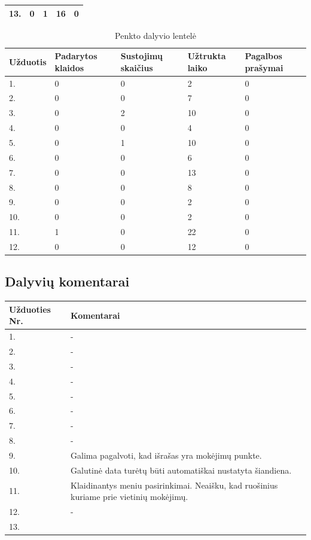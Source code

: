 \documentclass[oneside]{VUMIFPSkursinis}
\begin{document}
\begin{center}
\begin{table}[!pht]
\begin{tabular}{ |p{1.8cm} | p{3.4cm} | p{3.4cm} | p{2.5cm} | p{3.5cm}|}
13.&0&1&16&0 \\ \hline
\end{tabular}
\end{table}
\vspace{0.7cm}
	\begin{table}[!pht]
	\caption{Penkto dalyvio lentelė}
	\begin{tabular}{ |p{1.8cm} | p{3.4cm} | p{3.4cm} | p{2.5cm} | p{3.5cm}|}
	\hline
	Užduotis&Padarytos klaidos&Sustojimų skaičius&Užtrukta laiko&Pagalbos prašymai\\ \hline
1.&0&0&2&0 \\ \hline
2.&0&0&7&0 \\ \hline
3.&0&2&10&0 \\ \hline
4.&0&0&4&0 \\ \hline
5.&0&1&10&0 \\ \hline
6.&0&0&6&0 \\ \hline
7.&0&0&13&0 \\ \hline
8.&0&0&8&0 \\ \hline
9.&0&0&2&0 \\ \hline
10.&0&0&2&0 \\ \hline
11.&1&0&22&0 \\ \hline
12.&0&0&12&0 \\ \hline
\end{tabular}
\end{table}
\vspace{0.7cm}
\end{center}
\subsection{Dalyvių komentarai}
\begin{center}
	\begin{tabular}{ |p{3cm}| p{12cm} |}
	\hline
Užduoties Nr.&Komentarai\\ \hline
1. & - \\ \hline
2. & - \\ \hline
3. & - \\ \hline
4. & - \\ \hline
5. & - \\ \hline
6. & - \\ \hline
7. & - \\ \hline
8. & - \\ \hline
9. & Galima pagalvoti, kad išrašas yra mokėjimų punkte. \\ \hline
10. & Galutinė data turėtų būti automatiškai nustatyta šiandiena. \\ \hline
11. & Klaidinantys meniu pasirinkimai. Neaišku, kad ruošinius kuriame prie vietinių mokėjimų. \\ \hline
12. & - \\ \hline
13. &  \\ \hline
	\end{tabular}
\end{center}
\end{document}
